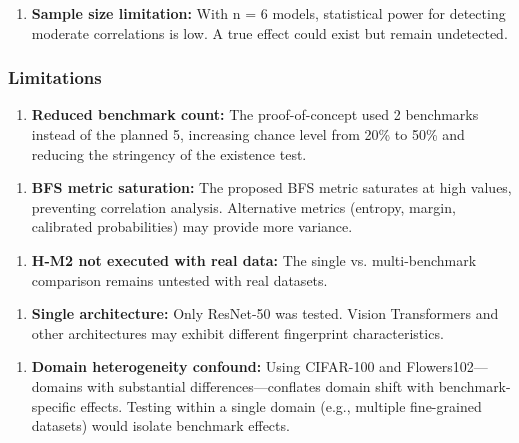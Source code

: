 \begin{enumerate}
\item \textbf{Sample size limitation:} With n = 6 models, statistical power for detecting moderate correlations is low. A true effect could exist but remain undetected.
\end{enumerate}

\subsubsection{Limitations}

\begin{enumerate}
\item \textbf{Reduced benchmark count:} The proof-of-concept used 2 benchmarks instead of the planned 5, increasing chance level from 20\% to 50\% and reducing the stringency of the existence test.
\end{enumerate}

\begin{enumerate}
\item \textbf{BFS metric saturation:} The proposed BFS metric saturates at high values, preventing correlation analysis. Alternative metrics (entropy, margin, calibrated probabilities) may provide more variance.
\end{enumerate}

\begin{enumerate}
\item \textbf{H-M2 not executed with real data:} The single vs. multi-benchmark comparison remains untested with real datasets.
\end{enumerate}

\begin{enumerate}
\item \textbf{Single architecture:} Only ResNet-50 was tested. Vision Transformers and other architectures may exhibit different fingerprint characteristics.
\end{enumerate}

\begin{enumerate}
\item \textbf{Domain heterogeneity confound:} Using CIFAR-100 and Flowers102---domains with substantial differences---conflates domain shift with benchmark-specific effects. Testing within a single domain (e.g., multiple fine-grained datasets) would isolate benchmark effects.
\end{enumerate}

